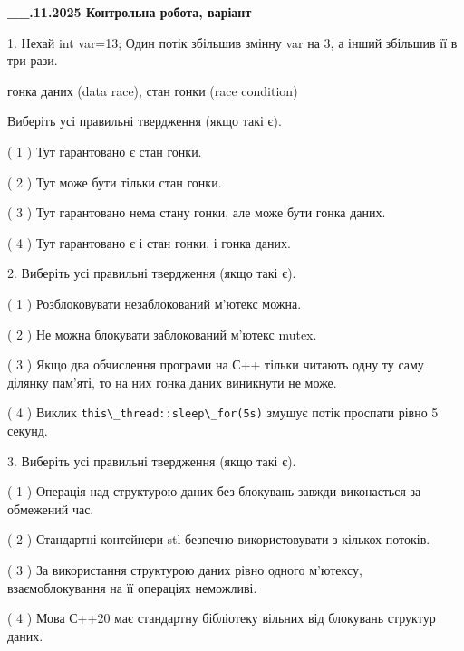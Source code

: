 \documentclass[12pt, ukrainian]{article}
\def\code#1{\Verb!#1!}
\begin{document}
\newpage
\begin {large}

\textbf{\_\_.11.2025 Контрольна робота, варіант  }\par


{
1. Нехай int var=13; Один потік збільшив змінну var на 3, а інший збільшив її в три рази.

гонка даних (data race), стан гонки (race condition)

Виберіть усі правильні твердження (якщо такі є).\par
\vspace{2mm}
( 1 ) Тут гарантовано є стан гонки.%

( 2 ) Тут може бути тільки стан гонки.%

( 3 ) Тут гарантовано нема стану гонки, але може бути гонка даних.%

( 4 ) Тут гарантовано є і стан гонки, і гонка даних.%


2. Виберіть усі правильні твердження (якщо такі є).\par
\vspace{2mm}

( 1 ) Розблоковувати незаблокований м’ютекс можна.%

( 2 ) Не можна блокувати заблокований м’ютекс mutex.%

( 3 ) Якщо два обчислення програми на С++ тільки читають одну ту саму ділянку пам'яті, то на них гонка даних  виникнути не може.%

( 4 ) Виклик \code{this\_thread::sleep\_for(5s)} змушує потік проспати рівно 5 секунд.%


3. Виберіть усі правильні твердження (якщо такі є).\par
\vspace{2mm}

( 1 ) Операція над структурою даних без блокувань завжди виконається за обмежений час.%

( 2 ) Стандартні контейнери stl безпечно використовувати з кількох потоків.%

( 3 ) За використання структурою даних рівно одного м’ютексу, взаємоблокування на її операціях неможливі.%

( 4 ) Мова С++20 має стандартну бібліотеку вільних від блокувань структур даних.%


}
\end{large}
\end{document}

